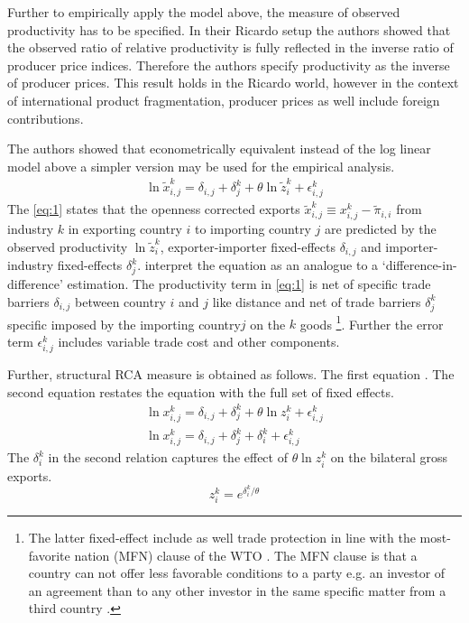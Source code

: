 \par 
Further to empirically apply the model above, the measure of observed productivity has to be specified. In their Ricardo setup
the authors showed that the observed ratio of relative productivity is fully reflected in the inverse ratio of producer price indices. Therefore the authors  specify productivity as the inverse of producer prices. This result holds in the Ricardo world, however in the context of international product fragmentation, producer prices as well include foreign contributions.
\par
The authors showed that econometrically equivalent instead of the log linear model above a simpler version may be used for the empirical analysis.
  \begin{align} \label{eq:1} \ln \tilde{x}_{i,j}^k=\delta_{i,j}+\delta_j^k + \theta \ln\tilde{z}_i^k+\epsilon^k_{i,j} \end{align}  
The \cref{eq:1} states that the openness corrected exports  $\tilde{x}_{i,j}^k \equiv x_{i,j}^k -  \tilde{\pi}_{i,i} $ from industry $k$ in exporting country $i$ to importing country $j$ are predicted by the observed productivity $\ln\tilde{z}_i^k$,  exporter-importer fixed-effects $\delta_{i,j}$ and importer-industry fixed-effects $\delta_j^k$. \textcite{costinot} interpret the equation as an analogue to a `difference-in-difference' estimation. 
The productivity term in \cref{eq:1} is net of specific trade barriers $\delta_{i,j}$ between country $i$ and $j$ like distance and net of trade barriers $\delta_j^k$ specific imposed by the importing country$j$ on the $k$ goods \footnote{The latter fixed-effect include as well  trade protection in line with the most-favorite nation (MFN) clause of the WTO \parencite{costinot}. The MFN clause is that a country can not offer less favorable conditions to a party e.g. an investor of an agreement than to any other investor in the same specific matter from a third country  \parencite{oecd-mfn}.}. Further the error term $\epsilon^k_{i,j}$ includes variable trade cost and other components. \par
Further, structural RCA measure is obtained as follows. The first equation  . The second equation restates the equation with the full set of fixed effects.
   \begin{align} \label{eq:2}\ln {x}_{i,j}^k=\delta_{i,j}+\delta_j^k + \theta \ln{z}_i^k
+\epsilon^k_{i,j} \\
\ln {x}_{i,j}^k=\delta_{i,j}+\delta_j^k + \delta_i^k + \epsilon^k_{i,j} \end{align}
The $\delta_i^k$ in the second relation captures the effect of  $\theta \ln{z}_i^k$ on the bilateral gross exports. 
  \[ z^k_i=e^{{\delta_i^ k}/{\theta}} \] 
